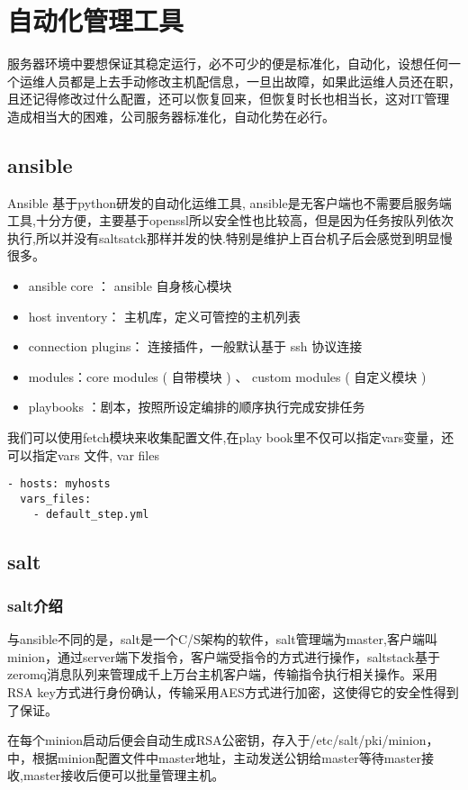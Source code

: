 \chapter{自动化管理工具}
服务器环境中要想保证其稳定运行，必不可少的便是标准化，自动化，设想任何一个运维人员都是上去手动修改主机配信息，一旦出故障，如果此运维人员还在职，且还记得修改过什么配置，还可以恢复回来，但恢复时长也相当长，这对IT管理造成相当大的困难，公司服务器标准化，自动化势在必行。
\section{ansible}
Ansible 基于python研发的自动化运维工具, ansible是无客户端也不需要启服务端工具,十分方便，主要基于openssl所以安全性也比较高，但是因为任务按队列依次执行,所以并没有saltsatck那样并发的快.特别是维护上百台机子后会感觉到明显慢很多。
\begin{itemize}
\item ansible core ： ansible 自身核心模块
\item host inventory： 主机库，定义可管控的主机列表
\item connection plugins： 连接插件，一般默认基于 ssh 协议连接
\item modules：core modules ( 自带模块 ) 、 custom modules ( 自定义模块 )
\item playbooks ：剧本，按照所设定编排的顺序执行完成安排任务
\end{itemize}
我们可以使用fetch模块来收集配置文件,在play book里不仅可以指定vars变量，还可以指定vars 文件, var files
\begin{lstlisting}
- hosts: myhosts
  vars_files:
    - default_step.yml
\end{lstlisting}

\section{salt}

\subsection{salt介绍}
与ansible不同的是，salt是一个C/S架构的软件，salt管理端为master,客户端叫minion，通过server端下发指令，客户端受指令的方式进行操作，saltstack基于zeromq消息队列来管理成千上万台主机客户端，传输指令执行相关操作。采用RSA key方式进行身份确认，传输采用AES方式进行加密，这使得它的安全性得到了保证。

在每个minion启动后便会自动生成RSA公密钥，存入于/etc/salt/pki/minion，中，根据minion配置文件中master地址，主动发送公钥给master等待master接收,master接收后便可以批量管理主机。

